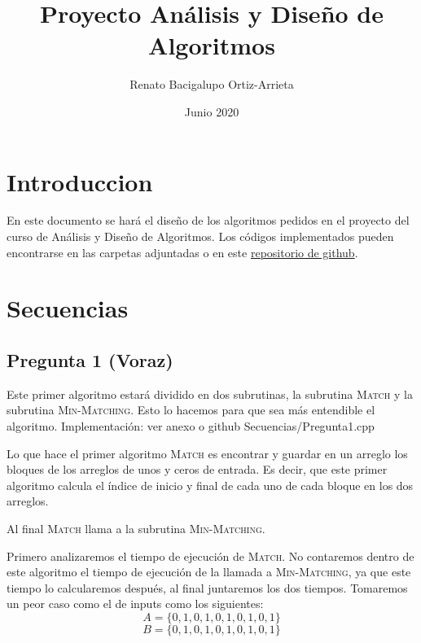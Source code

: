 \documentclass[12pt]{article}
\begin{document}
\title{Proyecto Análisis y Diseño de Algoritmos}
\author{Renato Bacigalupo Ortiz-Arrieta}
\date{Junio 2020}

\maketitle

\section{Introduccion}

En este documento se hará el diseño de los algoritmos pedidos en el proyecto del curso de Análisis y Diseño de Algoritmos.
Los códigos implementados pueden encontrarse en las carpetas adjuntadas o en este 
\href{https://github.com/Renato01011/ProyectoADA}{repositorio de github}.


\section{Secuencias}

\subsection*{Pregunta 1 (Voraz)}

Este primer algoritmo estará dividido en dos subrutinas, la subrutina \textsc{Match} y la subrutina \textsc{Min-Matching}. Esto lo hacemos para que sea más entendible el algoritmo. Implementación: ver anexo o github Secuencias/Pregunta1.cpp\vspace{5mm}

Lo que hace el primer algoritmo \textsc{Match} es encontrar y guardar en un arreglo los bloques de los arreglos de unos y ceros de entrada. Es decir, que este primer algoritmo calcula el índice de inicio y final de cada uno de cada bloque en los dos arreglos.

Al final \textsc{Match} llama a la subrutina \textsc{Min-Matching}.

Primero analizaremos el tiempo de ejecución de \textsc{Match}. No contaremos dentro de este algoritmo el tiempo de ejecución de la llamada a \textsc{Min-Matching}, ya que este tiempo lo calcularemos después, al final juntaremos los dos tiempos. Tomaremos un peor caso como el de inputs como los siguientes:
$$A=\{0,1,0,1,0,1,0,1,0,1\}$$
$$B=\{0,1,0,1,0,1,0,1,0,1\}$$
\end{document}
